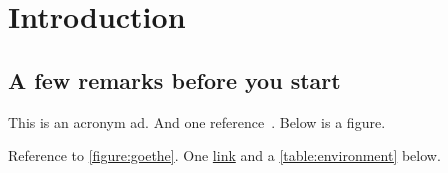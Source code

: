 \chapter{Introduction}\label{section:introduction}

\thispagestyle{myheadings}

	\section{A few remarks before you start}\label{section:introduction:history}

		This is an acronym \Gls{ad}.
		And one reference~\cite{practical-ore}.
		Below is a figure.

		

		Reference to \cref{figure:goethe}.
		One \href{https://dbogatov.org}{link} and a \cref{table:environment} below.

		


